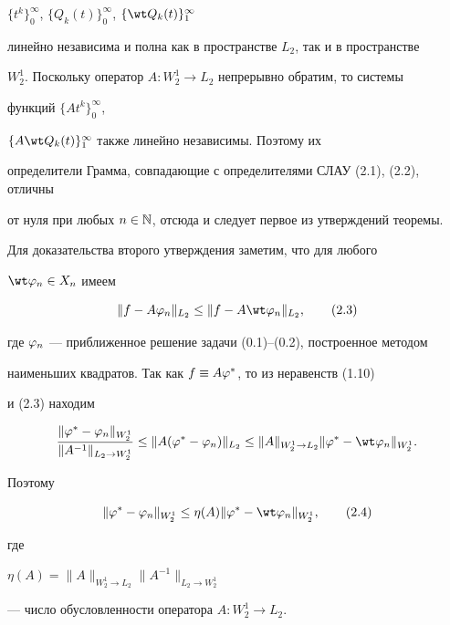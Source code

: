 $\{t^k\}^{\infty}_0$, $\{Q_k(t)\}_0^{\infty}$, $\{\wt Q_k(t)\}^{\infty}_1$ 


линейно независима и полна как в пространстве $L_2$, так и в пространстве 


$W^1_2$. Поскольку оператор $A:W^1_2\to L_2$ непрерывно обратим, то системы 


функций $\{At^k\}^{\infty}_0$,


$\{A\wt Q_k(t)\}^{\infty}_1$ также линейно независимы. Поэтому их 


определители Грамма, совпадающие с определителями СЛАУ (2.1), (2.2), отличны 


от нуля при любых $n\in\Bbb N$, отсюда и следует первое из утверждений теоремы.





Для доказательства второго утверждения заметим, что для любого 


$\wt\vp_n\in X_n$ имеем


\begin{equation}


\|f-A\vp_n\|_{L_2}\le\|f-A\wt\vp_n\|_{L_2},


\tag{2.3}


\end{equation}


где $\varphi_n$ --- приближенное решение задачи (0.1)--(0.2), построенное методом


наименьших квадратов. Так как $f\equiv A\varphi^{*}$, то из неравенств (1.10) 


и (2.3) находим


$$


\frac{\|\vp^{*}-\vp_n\|_{W^1_2}}{\|A^{-1}\|_{L_2\to W^1_2}}\le\|A(\vp^{*}-


\vp_n)\|_{L_2}\le\|A\|_{W^1_2\to L_2}\|\vp^{*}-\wt\vp_n\|_{W^1_2}.


$$


Поэтому


\begin{equation}


\|\vp^{*}-\vp_n\|_{W^1_2}\le\eta(A)\|\vp^{*}-\wt\vp_n\|_{W^1_2},


\tag{2.4}


\end{equation}


где


$\eta(A)=\|A\|_{W^1_2\to L_2}\|A^{-1}\|_{L_2\to W^1_2}$


--- число обусловленности оператора $A:W^1_2\to L_2$.


